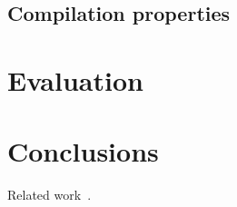 \documentclass{article}
\begin{document}
\subsection{Compilation properties}



\section{Evaluation}



\section{Conclusions}
Related work~\cite{SternJ17}.




\end{document}
